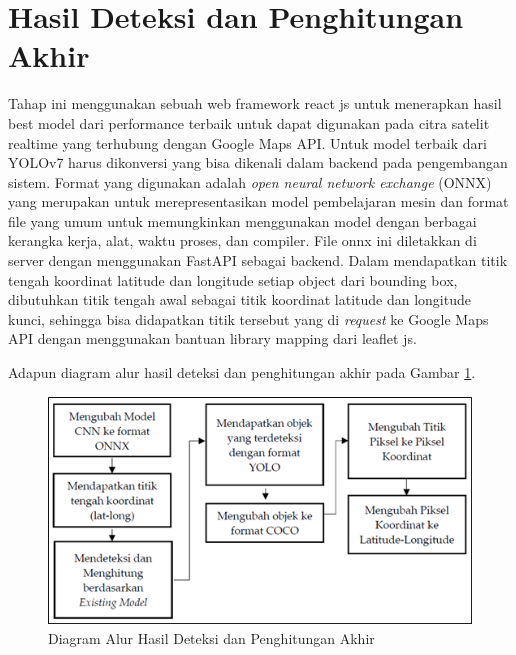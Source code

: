 \section{Hasil Deteksi dan Penghitungan Akhir}
\hspace{1,2cm}Tahap ini menggunakan sebuah web framework react js untuk menerapkan hasil best model dari performance terbaik untuk dapat digunakan pada citra satelit realtime yang terhubung dengan Google Maps API. Untuk model terbaik dari YOLOv7 harus dikonversi yang bisa dikenali dalam backend pada pengembangan sistem. Format yang digunakan adalah \textit{open neural network exchange} (ONNX) yang merupakan untuk merepresentasikan model pembelajaran mesin dan format file yang umum untuk memungkinkan menggunakan model dengan berbagai kerangka kerja, alat, waktu proses, dan compiler. File onnx ini diletakkan di server dengan menggunakan FastAPI sebagai backend. Dalam mendapatkan titik tengah koordinat latitude dan longitude setiap object dari bounding box, dibutuhkan titik tengah awal sebagai titik koordinat latitude dan longitude kunci, sehingga bisa didapatkan titik tersebut yang di \textit{request} ke Google Maps API dengan menggunakan bantuan library mapping dari leaflet js.

Adapun diagram alur hasil deteksi dan penghitungan akhir pada Gambar \ref{img:Diagram-ALur-Hasil-Deteksi-dan-Perhitungan-Akhir}.

\begin{figure}[H]
	\vspace{-0.1cm}
	\begin{center}
		\includegraphics[width=1\columnwidth]{bab3/Gambar/Picture15.png}
	\end{center}
	\vspace{-0.2cm}
	\captionsetup{justification=centering}
	\caption{Diagram Alur Hasil Deteksi dan Penghitungan Akhir}\label{img:Diagram-ALur-Hasil-Deteksi-dan-Perhitungan-Akhir}
\end{figure}

